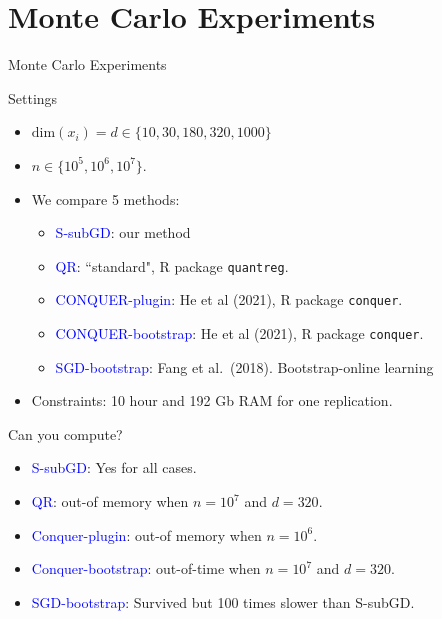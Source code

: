 \documentclass[beamer, t]{beamer}
\newcommand{\bit}{\begin{itemize}}
\newcommand{\eit}{\end{itemize}}
\newcommand{\tcb}{\textcolor{blue}}
\begin{document}
\section{Monte Carlo Experiments}

\begin{frame}
	\vfill
	\centering
	\LARGE{Monte Carlo Experiments}
	\vfill
\end{frame}


 
\begin{frame}{Settings} 
	\begin{itemize}
		\item $\mbox{dim}(x_i)=d\in\{10, 30, 180, 320, 1000\}$
		\item $n\in\{10^5, 10^6,10^7\}.$
		\item We compare 5 methods:
		
		\bit
			\item \tcb{S-subGD}: our method
			
			\item \tcb{QR}: ``standard", R package \texttt{quantreg}. 
			
			\item \tcb{CONQUER-plugin}: He et al (2021), R package
			\texttt{conquer}.
			
			\item \tcb{CONQUER-bootstrap}: He et al (2021), R package
			\texttt{conquer}.
			
			\item \tcb{SGD-bootstrap}: Fang et al.~(2018). Bootstrap-online learning
			
			
		\eit
		
		\medskip
		\item Constraints: 10 hour and 192 Gb RAM for one replication.
	\end{itemize}
	
	
\end{frame}



\begin{frame}{Can you compute?} 
	
	\bit
		
		\item \tcb{S-subGD}: Yes for all cases.
		
		\item \tcb{QR}:  out-of memory when $n= 10^7$ and $d=320$.
		
		\item \tcb{Conquer-plugin}:  out-of memory when $n=10^6$.
		
		\item \tcb{Conquer-bootstrap}: out-of-time when $n= 10^7$ and $d=320$.
		
		\item \tcb{SGD-bootstrap}: Survived but 100 times slower than S-subGD.
		
		
	\eit
	
	
	
\end{frame}
\end{document}
